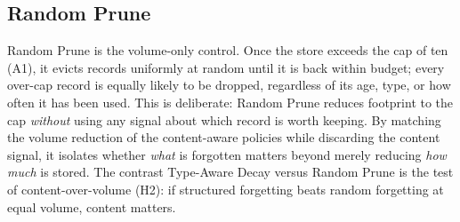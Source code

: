 
\subsection{Random Prune}

Random Prune is the volume-only control. Once the store exceeds the cap of ten (A1), it
evicts records uniformly at random until it is back within budget; every over-cap record is
equally likely to be dropped, regardless of its age, type, or how often it has been used.
This is deliberate: Random Prune reduces footprint to the cap \emph{without} using any
signal about which record is worth keeping. By matching the volume reduction of the
content-aware policies while discarding the content signal, it isolates whether \emph{what}
is forgotten matters beyond merely reducing \emph{how much} is stored. The contrast
Type-Aware Decay versus Random Prune is the test of content-over-volume (H2): if structured
forgetting beats random forgetting at equal volume, content matters.
